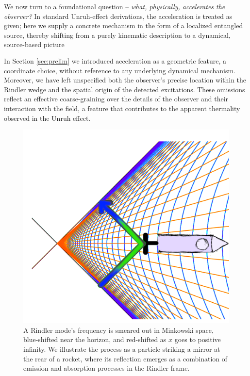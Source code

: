\documentclass[12pt,a4paper]{article}
\begin{document}
We now turn to a foundational question -- {\it what, physically, accelerates the observer?} In standard Unruh-effect derivations, the acceleration is treated as given; here we supply a concrete mechanism in the form of a localized entangled source, thereby shifting from a purely kinematic description to a dynamical, source-based picture

In Section \ref{sec:prelim} we introduced acceleration as a geometric feature, a coordinate choice, without reference to any underlying dynamical mechanism. Moreover, we have left unspecified both the observer’s precise location within the Rindler wedge and the spatial origin of the detected excitations. These omissions reflect an effective coarse-graining over the details of the observer and their interaction with the field, a feature that contributes to the apparent thermality observed in the Unruh effect.

\begin{figure}[h]
\centering
\includegraphics[scale=1.0]{emit_absorb.png}
\captionsetup{width=0.7\textwidth}
\caption{A Rindler mode's frequency is smeared out in Minkowski space, blue-shifted near the horizon, and red-shifted as $x$ goes to positive infinity. We illustrate the process as a particle striking a mirror at the rear of a rocket, where its reflection emerges as a combination of emission and absorption processes in the Rindler frame.}
\label{emit_absorb}
\end{figure}
\end{document}
